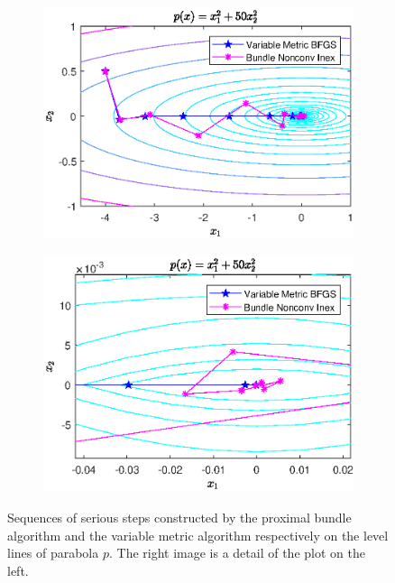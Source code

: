 \begin{figure}[ht]
	\begin{subfigure}[t]{0.49\textwidth}
		\includegraphics[width=\textwidth]{Pictures/Plots/final_parab.eps}
	\end{subfigure}
	\begin{subfigure}[t]{0.49\textwidth}
		\begin{center}
			\includegraphics[width=\textwidth]{Pictures/Plots/final_parab_detail.eps}
		\end{center}
	\end{subfigure}
	\caption{Sequences of serious steps constructed by the proximal bundle algorithm and the variable metric algorithm respectively on the level lines of parabola \(p\). The right image is a detail of the plot on the left.}
	\label{fig_contour_parab}
\end{figure}

